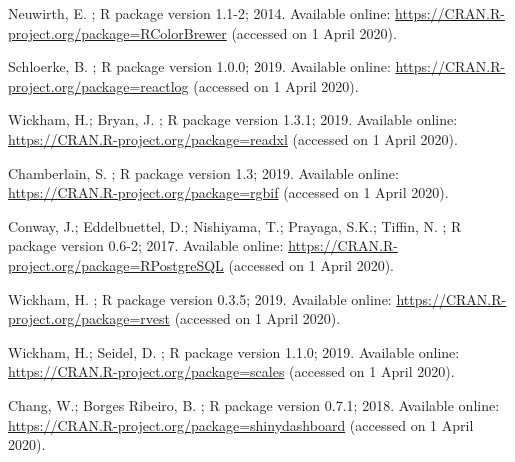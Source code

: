 \documentclass[data,datadescriptor,accept,moreauthors,pdftex]{Definitions/mdpi}
\begin{document}
\begin{thebibliography}{999}
Neuwirth, E.
;
\newblock R package version 1.1-2;  2014.
\newblock Available online: \url{https://CRAN.R-project.org/package=RColorBrewer}
\newblock (accessed on 1 April 2020).

Schloerke, B.
;
\newblock R package version 1.0.0;  2019.
\newblock Available online: \url{https://CRAN.R-project.org/package=reactlog}
\newblock (accessed on 1 April 2020).

Wickham, H.; Bryan, J.
;
\newblock R package version 1.3.1;  2019.
\newblock Available online: \url{https://CRAN.R-project.org/package=readxl}
\newblock (accessed on 1 April 2020).

Chamberlain, S.
;
\newblock R package version 1.3;  2019.
\newblock Available online: \url{https://CRAN.R-project.org/package=rgbif}
\newblock (accessed on 1 April 2020).

Conway, J.; Eddelbuettel, D.; Nishiyama, T.; Prayaga, S.K.; Tiffin, N.
;
\newblock R package version 0.6-2;  2017.
\newblock Available online: \url{https://CRAN.R-project.org/package=RPostgreSQL}
\newblock (accessed on 1 April 2020).

Wickham, H.
; 
\newblock R package version 0.3.5;  2019.
\newblock Available online: \url{https://CRAN.R-project.org/package=rvest}
\newblock (accessed on 1 April 2020).

Wickham, H.; Seidel, D.
;
\newblock R package version 1.1.0;  2019.
\newblock Available online: \url{https://CRAN.R-project.org/package=scales}
\newblock (accessed on 1 April 2020).

Chang, W.; {Borges Ribeiro}, B.
;
\newblock R package version 0.7.1;  2018.
\newblock Available online: \url{https://CRAN.R-project.org/package=shinydashboard}
\newblock (accessed on 1 April 2020).


\end{thebibliography}
\end{document}
